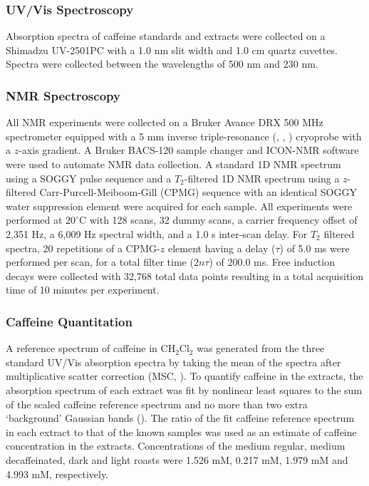 \subsubsection{UV/Vis Spectroscopy}

\begin{doublespace}
Absorption spectra of caffeine standards and extracts were collected on a
Shimadzu UV-2501PC with a 1.0 nm slit width and 1.0 cm quartz cuvettes. Spectra
were collected between the wavelengths of 500 nm and 230 nm.
\end{doublespace}

\subsubsection{NMR Spectroscopy}

\begin{doublespace}
All NMR experiments were collected on a Bruker Avance DRX 500 MHz spectrometer
equipped with a 5 mm inverse triple-resonance (\hnmr{}, \cnmr{}, \nnmr{})
cryoprobe with a $z$-axis gradient. A Bruker BACS-120 sample changer and
ICON-NMR software were used to automate NMR data collection. A standard 1D
\hnmr{} NMR spectrum using a SOGGY pulse sequence
\cite{hwang:jmr1995,nguyen:jmr2007} and a $T_2$-filtered 1D \hnmr{} NMR
spectrum using a $z$-filtered Carr-Purcell-Meiboom-Gill (CPMG) sequence
\cite{rastrelli:jacs2009} with an identical SOGGY water suppression element
were acquired for each sample. All experiments were performed at $20^\circ$C
with 128 scans, 32 dummy scans, a carrier frequency offset of 2,351 Hz, a
6,009 Hz spectral width, and a 1.0 s inter-scan delay. For $T_2$ filtered
spectra, 20 repetitions of a CPMG-$z$ element having a delay ($\tau$) of 5.0
ms were performed per scan, for a total filter time ($2n\tau$) of 200.0 ms.
Free induction decays were collected with 32,768 total data points resulting
in a total acquisition time of 10 minutes per experiment.
\end{doublespace}

\subsubsection{Caffeine Quantitation}

\begin{doublespace}
A reference spectrum of caffeine in CH$_2$Cl$_2$ was generated from the three
standard UV/Vis absorption spectra by taking the mean of the spectra after
multiplicative scatter correction (MSC, \cite{fearn:cils2009}). To quantify
caffeine in the extracts, the absorption spectrum of each extract was fit by
nonlinear least squares \cite{marquardt:jsiam1963} to the sum of the scaled
caffeine reference spectrum and no more than two extra `background' Gaussian
bands (). The ratio of the fit caffeine reference
spectrum in each extract to that of the known samples was used as an estimate
of caffeine concentration in the extracts. Concentrations of the medium
regular, medium decaffeinated, dark and light roasts were
1.526 mM, 0.217 mM, 1.979 mM and 4.993 mM, respectively.
\end{doublespace}

